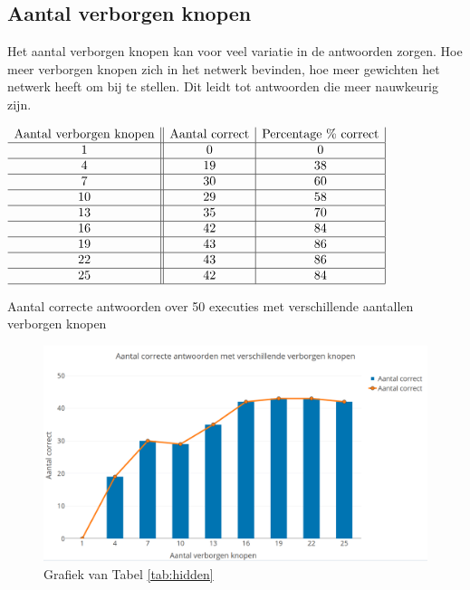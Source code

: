 \subsection{Aantal verborgen knopen}
Het aantal verborgen knopen kan voor veel variatie in de antwoorden zorgen. Hoe meer verborgen knopen zich in het netwerk bevinden, hoe meer gewichten het netwerk heeft om bij te stellen. Dit leidt tot antwoorden die meer nauwkeurig zijn.

\begin{table}[ht]
    \centering
      $\begin{array}{c||c|c |}
        \text{Aantal verborgen knopen} & \text{Aantal correct} & \text{Percentage \% correct} \\ \hline
        1 & 0 & 0 \\ \hline
        4 & 19 & 38 \\ \hline
        7 & 30 & 60 \\ \hline
        10 & 29 & 58 \\ \hline
        13 & 35 & 70 \\ \hline
        16 & 42 & 84 \\ \hline
        19 & 43 & 86 \\ \hline
        22 & 43 & 86 \\ \hline
        25 & 42 & 84 \\ \hline
      \end{array}$
    \caption{Aantal correcte antwoorden over 50 executies met verschillende aantallen verborgen knopen}
    \label{tab:hidden}
\end{table}

\begin{figure}[ht]
    \centering
    \includegraphics[scale=0.3]{graphs/knopen.png}
    \caption{Grafiek van Tabel \ref{tab:hidden}}
    \label{fig:hidden}
\end{figure}
